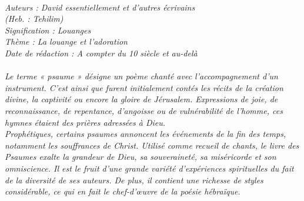 \BFont
\noindent\hrulefill
{\footnotesize
\textit{
\bigskip
{\centering{}
\\Auteurs : David essentiellement et d'autres écrivains
\\(Heb. : Tehilim)
\\Signification : Louanges 
\\Thème : La louange et l'adoration
\\Date de rédaction : A compter du 10 siècle et au-delà\\}
}
\textit{
\\Le terme « psaume » désigne un poème chanté avec l'accompagnement d'un instrument. C'est ainsi que furent initialement contés les récits de la création divine, la captivité ou encore la gloire de Jérusalem. Expressions de joie, de reconnaissance, de repentance, d'angoisse ou de vulnérabilité de l'homme, ces hymnes étaient des prières adressées à Dieu.
\\Prophétiques, certains psaumes annoncent les événements de la fin des temps, notamment les souffrances de Christ. Utilisé comme recueil de chants, le livre des Psaumes exalte la grandeur de Dieu, sa souveraineté, sa miséricorde et son omniscience. Il est le fruit d'une grande variété d'expériences spirituelles du fait de la diversité de ses auteurs. De plus, il contient une richesse de styles considérable, ce qui en fait le chef-d'œuvre de la poésie hébraïque.\bigskip
}
}
\par\nobreak\noindent\hrulefill
